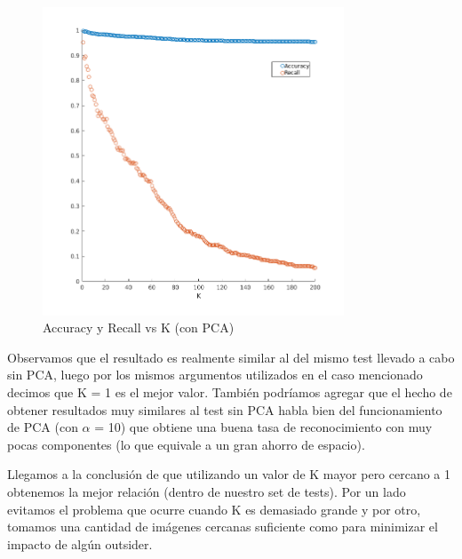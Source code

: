 \begin{figure}[H]
	\centering
	\includegraphics[width=0.8\textwidth]{img/Acc_recall_k_pca.png}
	\caption{Accuracy y Recall vs K (con PCA)}
	\label{fig: Accuracy y Recall vs K (con PCA)}
\end{figure}
Observamos que el resultado es realmente similar al del mismo test llevado a cabo sin PCA, luego por los mismos argumentos utilizados en el caso mencionado decimos que K = 1 es el mejor valor.
También podríamos agregar que el hecho de obtener resultados muy similares al test sin PCA habla bien del funcionamiento de PCA (con $\alpha$ = 10) que obtiene una buena tasa de reconocimiento con muy pocas componentes (lo que equivale a un gran ahorro de espacio).

Llegamos a la conclusión de que utilizando un valor de K mayor pero cercano a 1 obtenemos la mejor relación (dentro de nuestro set de tests).
Por un lado evitamos el problema que ocurre cuando K es demasiado grande y por otro, tomamos una cantidad de imágenes cercanas suficiente como para minimizar el impacto de algún outsider.


